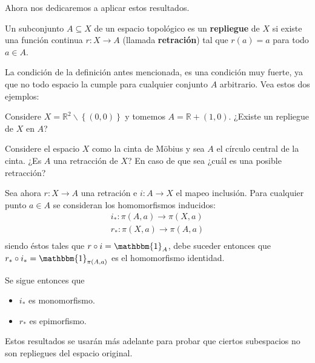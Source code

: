 \documentclass[12pt]{report}
\theoremstyle{largebreak}
\newcommand\cf[3]{\ensuremath{#1:#2\rightarrow#3}}
\newcommand{\bbm}[1]{\ensuremath{\mathbbm{#1}}}
\begin{document}
    Ahora nos dedicaremos a aplicar estos resultados.

    \begin{mydef}
        Un subconjunto $A\subseteq X$ de un espacio topológico es un \textbf{repliegue} de $X$ si existe una función continua $\cf{r}{X}{A}$ (llamada \textbf{retración}) tal que $r(a)=a$ para todo $a\in A$.
    \end{mydef}

    La condición de la definición antes mencionada, es una condición muy fuerte, ya que no todo espacio la cumple para cualquier conjunto $A$ arbitrario. Vea estos dos ejemplos:

    \begin{exa}
        Considere $X=\mathbb{R}^2\backslash\left\{(0,0)\right\}$ y tomemos $A=\mathbb{R}+(1,0)$. ¿Existe un repliegue de $X$ en $A$?
    \end{exa}

    \begin{exa}
        Considere el espacio $X$ como la cinta de Möbius y sea $A$ el círculo central de la cinta. ¿Es $A$ una retracción de $X$? En caso de que sea ¿cuál es una posible retracción?
    \end{exa}

    Sea ahora $\cf{r}{X}{A}$ una retración e $\cf{i}{A}{X}$ el mapeo inclusión. Para cualquier punto $a\in A$ se consideran los homomorfismos inducidos:
    \begin{equation*}
        \begin{split}
            \cf{i_*}{\pi(A,a)}{\pi(X,a)}\\
            \cf{r_*}{\pi(X,a)}{\pi(A,a)}\\
        \end{split}
    \end{equation*}
    siendo éstos tales que $r\circ i=\bbm{1}_{A}$, debe suceder entonces que $r_*\circ i_*=\bbm{1}_{\pi(A,a)}$ es el homomorfismo identidad.
    
    Se sigue entonces que
    \begin{itemize}
        \item $i_*$ es monomorfismo.
        \item $r_*$ es epimorfismo.
    \end{itemize}

    Estos resultados se usarán más adelante para probar que ciertos subespacios no son repliegues del espacio original.
\end{document}
